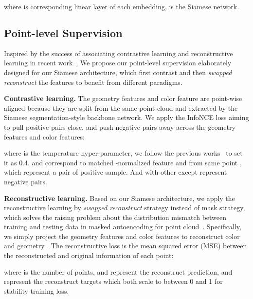 \documentclass{article}
\begin{document}
where  is corresponding linear layer of each embedding,   is the Siamese network.
\subsection{Point-level Supervision}
\vspace{-0.25cm}
\label{sec:point-level}
Inspired by the success of associating contrastive learning and reconstructive learning in recent work~\citep{recon23}, 
We propose our point-level supervision elaborately designed for our Siamese architecture, which first contrast and then \textit{swapped reconstruct} the features to benefit from different paradigms.

\textbf{Contrastive learning.} The geometry features  and color feature  are point-wise aligned because they are split from the same point cloud  and extracted by the Siamese segmentation-style backbone network. We apply the InfoNCE loss aiming to pull positive pairs close, and push negative pairs away across the geometry features and color features:

where  is the temperature hyper-parameter, we follow the previous works~\citep{PointContrast} to set it as 0.4.  and  correspond to matched -normalized feature  and  from same point , which represent a pair of positive sample. And  with other  except  represent negative pairs.

\textbf{Reconstructive learning.} Based on our Siamese architecture, we apply the reconstructive learning by \textit{swapped reconstruct} strategy instead of mask strategy, which solves the raising problem about the distribution mismatch between training and testing data in masked autoencoding for point cloud~\cite{MaskPoint}. Specifically, we simply project the geometry features  and color features  to reconstruct color  and geometry . The reconstructive loss is the mean squared error (MSE) between the reconstructed and original information of each point: 

where  is the number of points,  and  represent the reconstruct prediction,  and  represent the reconstruct targets which both scale to between 0 and 1 for stability training loss.
\end{document}
